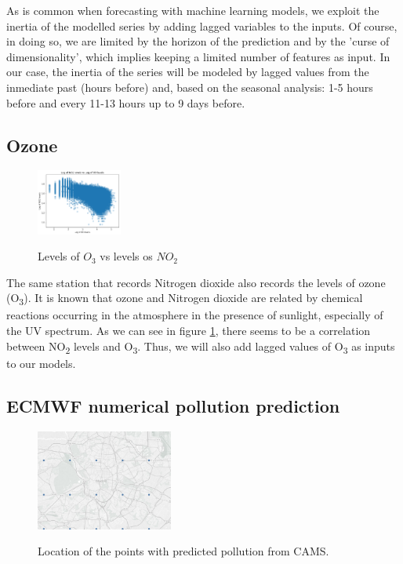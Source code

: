 \documentclass[a4paper,twocolumn,5p]{elsarticle}
\begin{document}
As is common when forecasting with machine learning models, we exploit
the inertia of the modelled series by adding lagged variables to the
inputs. Of course, in doing so, we are limited by the horizon of the
prediction and by the 'curse of dimensionality', which implies keeping
a limited number of features as input. In our case, the inertia of the
series will be modeled by lagged values from the inmediate past (hours
before) and, based on the seasonal analysis: 1-5 hours before and
every 11-13 hours up to 9 days before.

\subsection{Ozone}

\begin{figure}
  \centering
  \includegraphics[width=0.25\textwidth]{no2vso3}
  \label{figure:no2vso3}
  \caption{Levels of $O_3$ vs levels os $NO_2$}
\end{figure}

The same station that records Nitrogen dioxide also records the levels
of ozone (O\textsubscript{3}). It is known that ozone and Nitrogen
dioxide are related by chemical reactions occurring in the atmosphere
in the presence of sunlight, especially of the UV spectrum.  As we can
see in figure \ref{figure:no2vso3}, there seems to be a correlation
between NO\textsubscript{2} levels and O\textsubscript{3}. Thus, we
will also add lagged values of O\textsubscript{3} as inputs to our
models.

\subsection{ECMWF numerical pollution prediction}
\label{sec:ecmwf-numer-poll}

\begin{figure}
  \centering
  \includegraphics[width=0.4\textwidth]{camspoints}
  \label{figure:camspoints}
  \caption{Location of the points with predicted pollution from CAMS.}
\end{figure}
\end{document}
